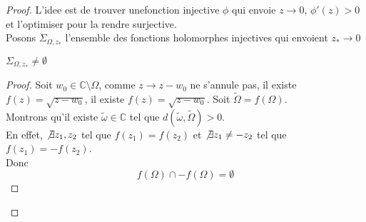 \documentclass[../main.tex]{subfiles}
\begin{document}
\begin{proof}
L'idee est de trouver unefonction injective $\phi$ qui envoie $z\to 0$, $\phi'( z) >0$ et l'optimiser pour la rendre surjective.\\
Posons $\Sigma_{\Omega,z_*} $ l'ensemble des fonctions holomorphes injectives qui envoient $z_*\to 0$
\begin{lemma}
$\Sigma_{\Omega,z_*} \neq \emptyset$ 
\end{lemma}
\begin{proof}
Soit $w_0\in \mathbb{C}\setminus \Omega$, comme $z\to z-w_0$ ne s'annule pas, il existe $f( z) = \sqrt{z-w_0} $, il existe $f( z) = \sqrt{z-w_0}$. Soit $\tilde\Omega= f( \Omega) $.\\
Montrons qu'il existe $\tilde \omega\in \mathbb{C}$ tel que $d( \tilde \omega, \tilde \Omega) >0$.\\
En effet, $\not\exists z_1,z_2$ tel que $f( z_1) = f( z_2) $ et $\not\exists z_1\neq - z_2$ tel que $f( z_1) = - f( z_2) $.\\
Donc
\[ 
f( \Omega) \cap -f(  \Omega) = \emptyset
\]

\end{proof}

\end{proof}
\end{document}
